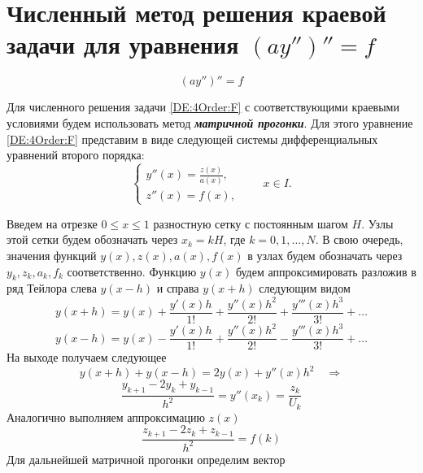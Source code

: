 \section{Численный метод решения краевой задачи для уравнения $(ay'')'' = f$}
\label{section:NumericalMethod:AuxiliaryProblem}
%
%
%
\begin{equation}
\label{DE:4Order:F}
(ay'')'' = f
\end{equation}
%
%
%
\par
Для численного решения задачи
\eqref{DE:4Order:F}
с соответствующими краевыми условиями
будем использовать метод \textbf{\emph{матричной прогонки}}.
%
%
%
Для этого уравнение
\eqref{DE:4Order:F}
представим в виде следующей системы дифференциальных уравнений второго порядка:
\begin{equation}
\begin{cases}
y''(x) = \displaystyle \frac{z(x)}{a(x)},
\\
z''(x) = f(x),
\end{cases}
\qquad
x \in I.
\end{equation}
%
%
%
%
%
\par
Введем на отрезке
\(0 \le x \le 1\)
разностную сетку с постоянным шагом \(H\).
%
%
%
Узлы этой сетки будем обозначать через
\(x_k = kH\),
где
\(k = 0, 1, \ldots, N\).
%
%
%
В свою очередь,
значения функций
\(y(x), z(x), a(x), f(x)\)
в узлах
будем обозначать через
\(y_k, z_k, a_k, f_k\)
соответственно.
%
%
%
 Функцию \(y(x)\) будем аппроксимировать разложив в ряд Тейлора слева \(y(x-h)\) и справа \(y(x+h)\) следующим видом
	\begin{equation*}
	y(x+h)=y(x) + \frac{y'(x)h}{1!} + \frac{y''(x)h^2}{2!} + \frac{y'''(x)h^3}{3!} + \ldots
	\end{equation*}
	\begin{equation}
	y(x-h)=y(x) - \frac{y'(x)h}{1!} + \frac{y''(x)h^2}{2!} - \frac{y'''(x)h^3}{3!} + \ldots
	\end{equation}
	На выходе получаем следующее
	\begin{equation*}
	y(x+h)+y(x-h) = 2y(x)+y''(x)h^2 \quad \Rightarrow
	\end{equation*}
	\begin{equation}
	\frac{y_{k+1}-2y_k+y_{k-1}}{h^2}=y''(x_k)=\frac{z_k}{U_k}
	\end{equation}
	Аналогично выполняем аппроксимацию \(z(x)\)
	\begin{equation}
	\frac{z_{k+1}-2z_k+z_{k-1}}{h^2}=f(k)
	\end{equation}
	Для дальнейшей матричной прогонки определим вектор
